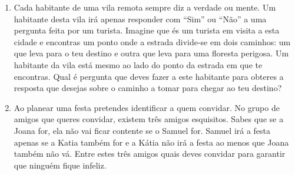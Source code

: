 \begin{enumerate}
  	\item Cada habitante de uma vila remota sempre diz a verdade ou mente. Um
  habitante desta vila irá apenas responder com ``Sim'' ou ``Não'' a uma
  pergunta feita por um turista. Imagine que és um turista em visita a esta
  cidade e encontras um ponto onde a estrada divide-se em dois caminhos: um que
  leva para o teu destino e outra que leva para uma floresta perigosa. Um
  habitante da vila está mesmo ao lado do ponto da estrada em que te encontras.
  Qual é pergunta que deves fazer a este habitante para obteres a resposta que
  desejas sobre o caminho a tomar para chegar ao teu destino?
  	\item Ao planear uma festa pretendes identificar a quem convidar. No grupo de
  amigos que queres convidar, existem três amigos esquisitos. Sabes que se a
  Joana for, ela não vai ficar contente se o Samuel for. Samuel irá a festa
  apenas se a Katia também for e a Kátia não irá a festa ao menos que Joana
  também não vá. Entre estes três amigos quais deves convidar para garantir que
  ninguém fique infeliz.


\end{enumerate}
